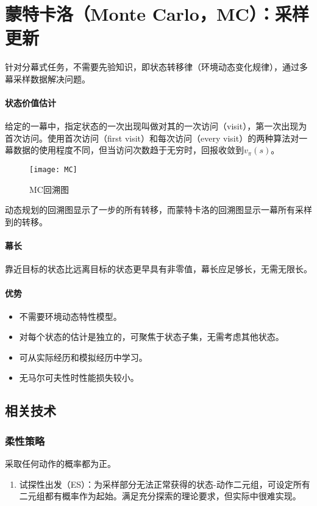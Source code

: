 \documentclass[
12pt, %
a4paper, 
oneside, %
headinclude,footinclude, %
]{scrartcl}
\begin{document}
\section{蒙特卡洛（Monte Carlo，MC）：采样更新}
针对分幕式任务，不需要先验知识，即状态转移律（环境动态变化规律），通过多幕采样数据解决问题。
\paragraph{状态价值估计}
给定的一幕中，指定状态的一次出现叫做对其的一次访问（visit），第一次出现为首次访问。使用首次访问（first visit）和每次访问（every visit）的两种算法对一幕数据的使用程度不同，但当访问次数趋于无穷时，回报收敛到$ v_{\pi}(s) $。

\begin{figure}[H]
\centering 
\texttt{[image: MC]} 
\caption[MC回溯图]{MC回溯图}
\end{figure}

动态规划的回溯图显示了一步的所有转移，而蒙特卡洛的回溯图显示一幕所有采样到的转移。
\paragraph{幕长}
靠近目标的状态比远离目标的状态更早具有非零值，幕长应足够长，无需无限长。
\paragraph{优势}
\begin{itemize}
\item 不需要环境动态特性模型。
\item 对每个状态的估计是独立的，可聚焦于状态子集，无需考虑其他状态。
\item 可从实际经历和模拟经历中学习。
\item 无马尔可夫性时性能损失较小。
\end{itemize}
\subsection{相关技术}
\subsubsection{柔性策略}
采取任何动作的概率都为正。
\begin{enumerate}
\item 试探性出发（ES）：为采样部分无法正常获得的状态-动作二元组，可设定所有二元组都有概率作为起始。满足充分探索的理论要求，但实际中很难实现。
\end{enumerate}
\end{document}
